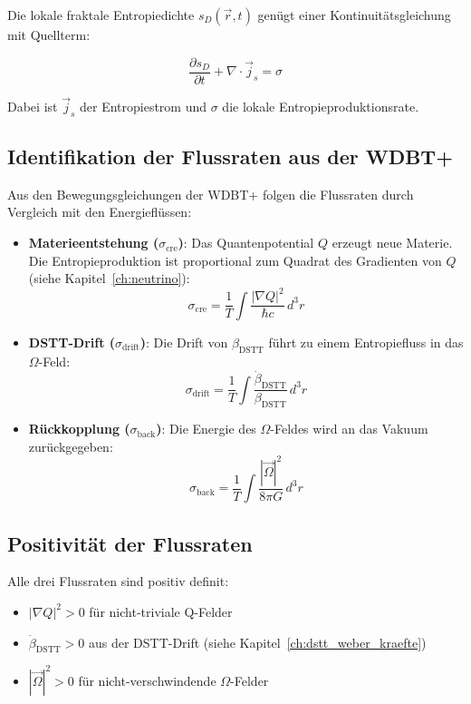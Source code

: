 Die lokale fraktale Entropiedichte \( s_D(\vec{r}, t) \) genügt einer Kontinuitätsgleichung mit Quellterm:

\[
\frac{\partial s_D}{\partial t} + \nabla \cdot \vec{j}_s = \sigma \tag{L.9}
\]

Dabei ist \( \vec{j}_s \) der Entropiestrom und \( \sigma \) die lokale Entropieproduktionsrate.

\subsection{Identifikation der Flussraten aus der WDBT+}
\label{sub:fraktale_entropie_identifikation}

Aus den Bewegungsgleichungen der WDBT+ folgen die Flussraten durch Vergleich mit den Energieflüssen:

\begin{itemize}
    \item \textbf{Materieentstehung (\( \sigma_{\text{cre}} \))}:  
          Das Quantenpotential \( Q \) erzeugt neue Materie. Die Entropieproduktion ist proportional zum Quadrat des Gradienten von \( Q \) (siehe Kapitel~\ref{ch:neutrino}):
          \[
          \sigma_{\text{cre}} = \frac{1}{T} \int \frac{|\nabla Q|^2}{\hbar c} \, d^3 r \tag{L.10}
          \]
    
    \item \textbf{DSTT-Drift (\( \sigma_{\text{drift}} \))}:  
          Die Drift von \( \beta_{\text{DSTT}} \) führt zu einem Entropiefluss in das \( \Omega \)-Feld:
          \[
          \sigma_{\text{drift}} = \frac{1}{T} \int \frac{\dot{\beta}_{\text{DSTT}}}{\beta_{\text{DSTT}}} \, d^3 r \tag{L.11}
          \]
    
    \item \textbf{Rückkopplung (\( \sigma_{\text{back}} \))}:  
          Die Energie des \( \Omega \)-Feldes wird an das Vakuum zurückgegeben:
          \[
          \sigma_{\text{back}} = \frac{1}{T} \int \frac{|\vec{\Omega}|^2}{8\pi G} \, d^3 r \tag{L.12}
          \]
\end{itemize}

\subsection{Positivität der Flussraten}
\label{sub:fraktale_entropie_positivitaet}

Alle drei Flussraten sind positiv definit:
\begin{itemize}
    \item \( |\nabla Q|^2 > 0 \) für nicht-triviale Q-Felder
    \item \( \dot{\beta}_{\text{DSTT}} > 0 \) aus der DSTT-Drift (siehe Kapitel~\ref{ch:dstt_weber_kraefte})
    \item \( |\vec{\Omega}|^2 > 0 \) für nicht-verschwindende \( \Omega \)-Felder
\end{itemize}

